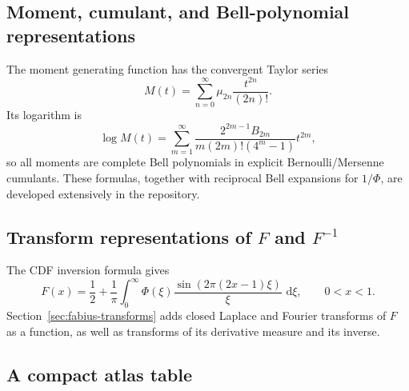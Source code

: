\documentclass[11pt]{article}
\theoremstyle{definition}
\theoremstyle{remark}
\newcommand{\dd}{\,\mathrm d}
\begin{document}
\subsection{Moment, cumulant, and Bell-polynomial representations}

The moment generating function has the convergent Taylor series
\begin{equation}
 M(t)=\sum_{n=0}^{\infty}\mu_{2n}\frac{t^{2n}}{(2n)!}.       \label{eq:M-moment-series}
\end{equation}
Its logarithm is
\begin{equation}
 \log M(t)=
 \sum_{m=1}^{\infty}
 \frac{2^{2m-1}B_{2m}}{m(2m)!(4^m-1)}t^{2m},                \label{eq:M-cumulant}
\end{equation}
so all moments are complete Bell polynomials in explicit Bernoulli/Mersenne cumulants.
These formulas, together with reciprocal Bell expansions for \(1/\Phi\), are developed
extensively in the repository.

\subsection{Transform representations of \(F\) and \(F^{-1}\)}

The CDF inversion formula gives
\begin{equation}
 F(x)=\frac12+\frac1\pi\int_0^{\infty}
 \Phi(\xi)\frac{\sin(2\pi(2x-1)\xi)}{\xi}\,\dd\xi,
 \qquad 0<x<1.                                               \label{eq:F-CDF-Fourier}
\end{equation}
Section~\ref{sec:fabius-transforms} adds closed Laplace and Fourier transforms of \(F\) as
a function, as well as transforms of its derivative measure and its inverse.

\subsection{A compact atlas table}
\end{document}
